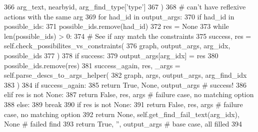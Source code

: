 \begin{DoxyCode}
366                 arg\_text, nearbyid, arg\_find\_type[\textcolor{stringliteral}{'type'}]
367             )
368             \textcolor{comment}{# can't have reflexive actions with the same arg}
369             \textcolor{keywordflow}{for} had\_id \textcolor{keywordflow}{in} output\_args:
370                 \textcolor{keywordflow}{if} had\_id \textcolor{keywordflow}{in} possible\_ids:
371                     possible\_ids.remove(had\_id)
372             res = \textcolor{keywordtype}{None}
373             \textcolor{keywordflow}{while} len(possible\_ids) > 0:
374                 \textcolor{comment}{# See if any match the constraints}
375                 success, res = self.check\_possibilites\_vs\_constraints(
376                     graph, output\_args, arg\_idx, possible\_ids
377                 )
378                 \textcolor{keywordflow}{if} success:
379                     output\_args[arg\_idx] = res
380                     possible\_ids.remove(res)
381                     success\_again, res, \_args = self.parse\_descs\_to\_args\_helper(
382                         graph, args, output\_args, arg\_find\_idx
383                     )
384                     \textcolor{keywordflow}{if} success\_again:
385                         \textcolor{keywordflow}{return} \textcolor{keyword}{True}, \textcolor{keywordtype}{None}, output\_args  \textcolor{comment}{# success!}
386                 \textcolor{keywordflow}{elif} res \textcolor{keywordflow}{is} \textcolor{keywordflow}{not} \textcolor{keywordtype}{None}:
387                     \textcolor{keywordflow}{return} \textcolor{keyword}{False}, res, args  \textcolor{comment}{# failure case, no matching option}
388                 \textcolor{keywordflow}{else}:
389                     \textcolor{keywordflow}{break}
390             \textcolor{keywordflow}{if} res \textcolor{keywordflow}{is} \textcolor{keywordflow}{not} \textcolor{keywordtype}{None}:
391                 \textcolor{keywordflow}{return} \textcolor{keyword}{False}, res, args  \textcolor{comment}{# failure case, no matching option}
392             \textcolor{keywordflow}{return} \textcolor{keywordtype}{None}, self.get\_find\_fail\_text(arg\_idx), \textcolor{keywordtype}{None}  \textcolor{comment}{# failed find}
393         \textcolor{keywordflow}{return} \textcolor{keyword}{True}, \textcolor{stringliteral}{''}, output\_args  \textcolor{comment}{# base case, all filled}
394 
\end{DoxyCode}
\mbox{\label{classlight__chats_1_1graph_1_1GraphFunction_a3b6764b365baf7471e53651adf83706b}} 

